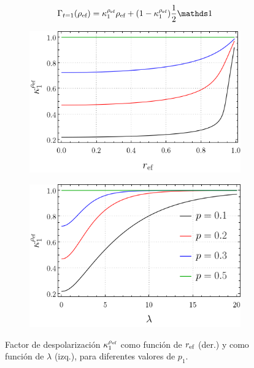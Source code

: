 \begin{equation}\label{eq:EffectiveSWAP1}
  \Gamma_{t=1}(\rho_{\ef})=\kappa_{1}^{\rho_{\ef}}\rho_{\ef}+(1-\kappa_{1}^{\rho_{\ef}})\frac{1}{2}\Id
\end{equation}
\begin{figure}[ht!]
  \centering
  \begin{subfigure}{0.5\textwidth}
    \centering
    \includegraphics[width=0.9\linewidth]{chapter3/figures_toy/K(r).png}
  \end{subfigure}%
  \begin{subfigure}{0.5\textwidth}
    \centering
    \includegraphics[width=0.9\linewidth]{chapter3/figures_toy/K(lambda).png}
  \end{subfigure}
  \caption{Factor de despolarización $\kappa_{1}^{\rho_{\text{ef}}}$ como función de $r_{\text{ef}}$ (der.) y como función de $\lambda$ (izq.), para diferentes valores de $p_{1}$.}\label{fig:SWAPFactor2Drl}
\end{figure}


